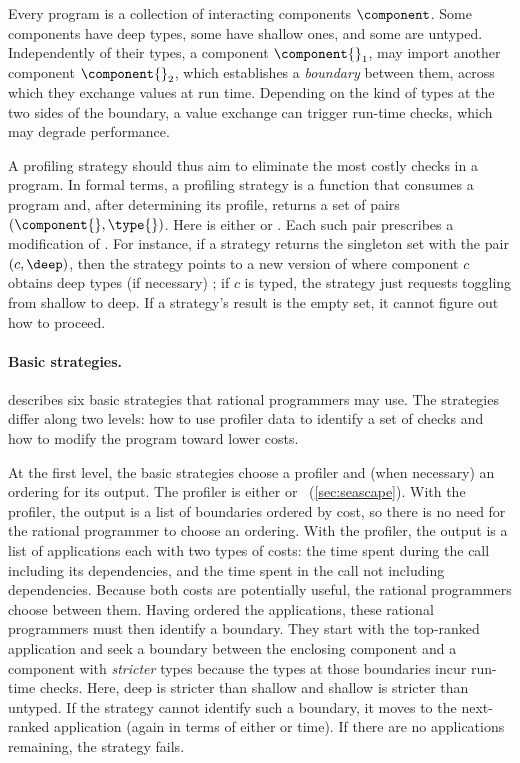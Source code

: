 Every program \program{} is a collection of interacting components $\component$.
Some components have deep types, some have shallow ones, and some
are untyped. Independently of their types, a component $\component{}_1$, may
import another component $\component{}_2$, which establishes a \emph{boundary}
between them, across which they exchange values at run time. Depending on the
kind of types at the two sides of the boundary, a value exchange can trigger
run-time checks, which may degrade performance.

A profiling strategy should thus aim to eliminate the most costly
checks in a program. In formal terms, a profiling strategy is a
function that consumes a program \program{} and, after determining its
profile, returns a set of pairs $(\component{}, \type{})$. Here \type{} is
either \deep{} or \shallow{}. Each such pair prescribes a modification of
\program{}. For instance, if a strategy returns the singleton set with the
pair $(c, \deep)$, then the strategy points to a new version of \program{}
where component $c$ obtains deep types (if necessary) ; if $c$ is typed,
the strategy just requests toggling from shallow to deep.  If a strategy's
result is the empty set, it cannot figure out how to proceed.

\paragraph{Basic strategies.}   describes six basic
strategies that rational programmers may use.
The strategies differ along two levels: how to use profiler data to identify
a set of checks and how to modify the program toward lower costs.

At the first level, the basic strategies choose a profiler and (when
necessary) an ordering for its output.  The profiler is either \featkw{}
or \statkw{}~(\cref{sec:seascape}).  With the \boundary{} profiler, the
output is a list of boundaries ordered by cost, so there is no need for
the rational programmer to choose an ordering.  With the \statistical{}
profiler, the output is a list of applications each with two types of costs:
the \totalkw{} time spent during the call including its
dependencies, and the \selfkw{} time spent in the call not including dependencies.
Because both costs are potentially useful, the rational programmers choose
between them.  Having ordered the applications, these rational programmers
must then identify a boundary.  They start with the top-ranked application 
and seek a boundary between the enclosing component and a component with
\emph{stricter} types because the types at those boundaries incur run-time checks.
Here, deep is stricter than shallow and shallow is stricter than untyped.
If the strategy cannot identify such a boundary, it moves to the
next-ranked application (again in terms of either \selfkw{} or \totalkw{}
time).  If there are no applications remaining, the strategy fails.

